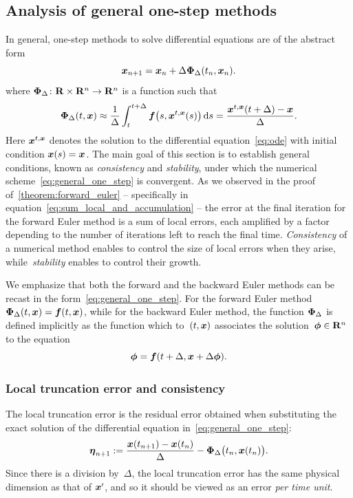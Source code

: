 \subsection{Analysis of general one-step methods}
\label{sub:one_step_general}
In general, one-step methods to solve differential equations are of the abstract form
\begin{equation}
    \label{eq:general_one_step}
    \mathbf{\boldsymbol{x}}_{n+1} = \mathbf{\boldsymbol{x}}_n + \Delta \mathbf{\boldsymbol{\Phi}}_{\Delta}(t_n, \mathbf{\boldsymbol{x}}_n).
\end{equation}
where $\mathbf{\boldsymbol{\Phi}}_{\Delta}\colon \mathbf R \times \mathbf R^n \to \mathbf R^n$ is a function such that
\begin{equation}
    \label{eq:one_step_integral}
    \mathbf{\boldsymbol{\Phi}}_{\Delta}(t, \mathbf{\boldsymbol{x}})
    \approx \frac{1}{\Delta} \int_{t}^{t+\Delta} \mathbf{\boldsymbol{f}}\bigl(s, \mathbf{\boldsymbol{x}}^{t, \mathbf{\boldsymbol{x}}}(s)\bigr) \, \mathrm d s
    = \frac{\mathbf{\boldsymbol{x}}^{t, \mathbf{\boldsymbol{x}}}(t + \Delta) - \mathbf{\boldsymbol{x}}}{\Delta}.
\end{equation}
Here $\mathbf{\boldsymbol{x}}^{t, \mathbf{\boldsymbol{x}}}$ denotes the solution to the differential equation~\eqref{eq:ode} with initial condition $\mathbf{\boldsymbol{x}}(s) = \mathbf{\boldsymbol{x}}$.
The main goal of this section is to establish general conditions,
known as \emph{consistency} and \emph{stability},
under which the numerical scheme~\eqref{eq:general_one_step} is convergent.
As we observed in the proof of~\cref{theorem:forward_euler}
-- specifically in equation~\eqref{eq:sum_local_and_accumulation} --
the error at the final iteration for the forward Euler method is a sum of local errors,
each amplified by a factor depending to the number of iterations left to reach the final time.
\emph{Consistency} of a numerical method enables to control the size of local errors when they arise,
while~\emph{stability} enables to control their growth.

We emphasize that both the forward and the backward Euler methods can be recast in the form~\eqref{eq:general_one_step}.
For the forward Euler method $\mathbf{\boldsymbol{\Phi}}_{\Delta}(t, \mathbf{\boldsymbol{x}}) = \mathbf{\boldsymbol{f}}(t, \mathbf{\boldsymbol{x}})$,
while for the backward Euler method, the function $\mathbf{\boldsymbol{\Phi}}_{\Delta}$ is defined implicitly as the function which to~$(t, \mathbf{\boldsymbol{x}})$ associates the solution~$\mathbf{\boldsymbol{\phi}} \in \mathbf R^n$ to the equation
\[
    \mathbf{\boldsymbol{\phi}} = \mathbf{\boldsymbol{f}}(t + \Delta, \mathbf{\boldsymbol{x}} + \Delta \mathbf{\boldsymbol{\phi}}).
\]
\subsubsection*{Local truncation error and consistency}%
The local truncation error is the residual error obtained when substituting the exact solution of the differential equation in~\eqref{eq:general_one_step}:
\[
    \mathbf{\boldsymbol{\eta}}_{n+1} := \frac{\mathbf{\boldsymbol{x}}(t_{n+1}) - \mathbf{\boldsymbol{x}}(t_n)}{\Delta} - \mathbf{\boldsymbol{\Phi}}_{\Delta}\bigl(t_n, \mathbf{\boldsymbol{x}}(t_n)\bigr).
\]
Since there is a division by~$\Delta$, the local truncation error has the same physical dimension as that of $\mathbf{\boldsymbol{x}}'$,
and so it should be viewed as an error \emph{per time unit}.


